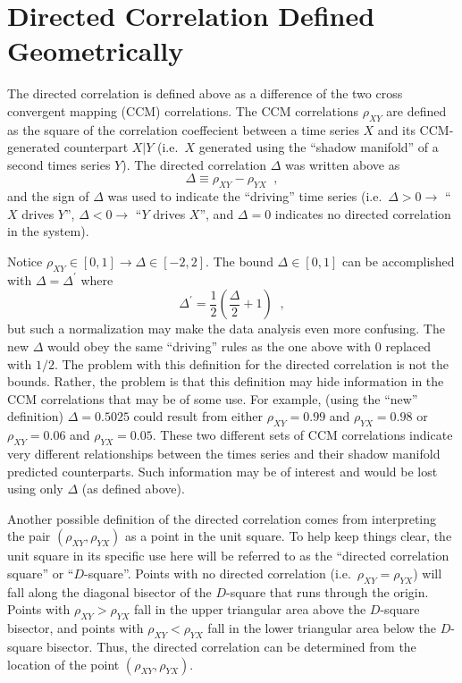\documentclass[a4paper,11pt]{article}
\begin{document}
\section{Directed Correlation Defined Geometrically}

The directed correlation is defined above as a difference of the two cross convergent mapping (CCM) correlations.  The CCM correlations $\rho_{XY}$ are defined as the square of the correlation coeffecient between a time series $X$ and its CCM-generated counterpart $X|Y$ (i.e.\ $X$ generated using the ``shadow manifold'' of a second times series $Y$).  The directed correlation $\Delta$ was written above as
$$
\Delta \equiv \rho_{XY} - \rho_{YX}\;\;,
$$
and the sign of $\Delta$ was used to indicate the ``driving'' time series (i.e.\ $\Delta>0\rightarrow$ ``$X$ drives $Y$'', $\Delta<0\rightarrow$ ``$Y$ drives $X$'', and $\Delta=0$ indicates no directed correlation in the system).

Notice $\rho_{XY}\in[0,1]\rightarrow\Delta\in[-2,2]$.  The bound $\Delta\in[0,1]$ can be accomplished with $\Delta=\Delta^\prime$ where
$$
\Delta^\prime = \frac{1}{2}\left(\frac{\Delta}{2}+1\right)\;\;,
$$
but such a normalization may make the data analysis even more confusing.  The new $\Delta$ would obey the same ``driving'' rules as the one above with $0$ replaced with $1/2$.  The problem with this definition for the directed correlation is not the bounds.  Rather, the problem is that this definition may hide information in the CCM correlations that may be of some use.  For example, (using the ``new'' definition) $\Delta = 0.5025$ could result from either $\rho_{XY} = 0.99$ and $\rho_{YX} = 0.98$ or $\rho_{XY} = 0.06$ and $\rho_{YX} = 0.05$.  These two different sets of CCM correlations indicate very different relationships between the times series and their shadow manifold predicted counterparts.  Such information may be of interest and would be lost using only $\Delta$ (as defined above).

Another possible definition of the directed correlation comes from interpreting the pair $\left(\rho_{XY},\rho_{YX}\right)$ as a point in the unit square.  To help keep things clear, the unit square in its specific use here will be referred to as the ``directed correlation square'' or ``$D$-square''.  Points with no directed correlation (i.e.\ $\rho_{XY}=\rho_{YX}$) will fall along the diagonal bisector of the $D$-square that runs through the origin.  Points with $\rho_{XY}>\rho_{YX}$ fall in the upper triangular area above the $D$-square bisector, and points with $\rho_{XY}<\rho_{YX}$ fall in the lower triangular area below the $D$-square bisector.  Thus, the directed correlation can be determined from the location of the point $\left(\rho_{XY},\rho_{YX}\right)$.
\end{document}
